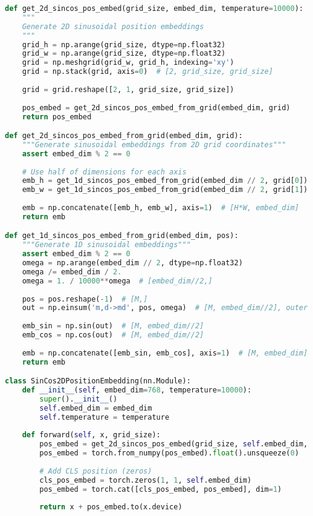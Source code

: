 \begin{lstlisting}[language=Python, caption=2D sinusoidal position embeddings]
def get_2d_sincos_pos_embed(grid_size, embed_dim, temperature=10000):
    """
    Generate 2D sinusoidal position embeddings
    """
    grid_h = np.arange(grid_size, dtype=np.float32)
    grid_w = np.arange(grid_size, dtype=np.float32)
    grid = np.meshgrid(grid_w, grid_h, indexing='xy')
    grid = np.stack(grid, axis=0)  # [2, grid_size, grid_size]
    
    grid = grid.reshape([2, 1, grid_size, grid_size])
    
    pos_embed = get_2d_sincos_pos_embed_from_grid(embed_dim, grid)
    return pos_embed

def get_2d_sincos_pos_embed_from_grid(embed_dim, grid):
    """Generate sinusoidal embeddings from 2D grid coordinates"""
    assert embed_dim % 2 == 0
    
    # Use half of dimensions for each axis
    emb_h = get_1d_sincos_pos_embed_from_grid(embed_dim // 2, grid[0])  # H
    emb_w = get_1d_sincos_pos_embed_from_grid(embed_dim // 2, grid[1])  # W
    
    emb = np.concatenate([emb_h, emb_w], axis=1)  # [H*W, embed_dim]
    return emb

def get_1d_sincos_pos_embed_from_grid(embed_dim, pos):
    """Generate 1D sinusoidal embeddings"""
    assert embed_dim % 2 == 0
    omega = np.arange(embed_dim // 2, dtype=np.float32)
    omega /= embed_dim / 2.
    omega = 1. / 10000**omega  # [embed_dim//2,]
    
    pos = pos.reshape(-1)  # [M,]
    out = np.einsum('m,d->md', pos, omega)  # [M, embed_dim//2], outer product
    
    emb_sin = np.sin(out)  # [M, embed_dim//2]
    emb_cos = np.cos(out)  # [M, embed_dim//2]
    
    emb = np.concatenate([emb_sin, emb_cos], axis=1)  # [M, embed_dim]
    return emb

class SinCos2DPositionEmbedding(nn.Module):
    def __init__(self, embed_dim=768, temperature=10000):
        super().__init__()
        self.embed_dim = embed_dim
        self.temperature = temperature
    
    def forward(self, x, grid_size):
        pos_embed = get_2d_sincos_pos_embed(grid_size, self.embed_dim, self.temperature)
        pos_embed = torch.from_numpy(pos_embed).float().unsqueeze(0)
        
        # Add CLS position (zeros)
        cls_pos_embed = torch.zeros(1, 1, self.embed_dim)
        pos_embed = torch.cat([cls_pos_embed, pos_embed], dim=1)
        
        return x + pos_embed.to(x.device)
\end{lstlisting}


